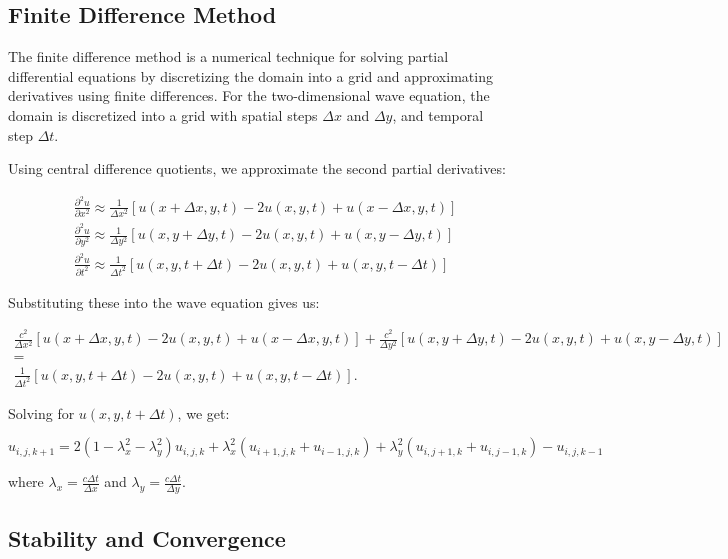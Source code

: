 \documentclass{article}
\begin{document}
\subsection{Finite Difference Method}

The finite difference method is a numerical technique for solving partial differential equations by discretizing the domain into a grid and approximating derivatives using finite differences. For the two-dimensional wave equation, the domain is discretized into a grid with spatial steps \(\Delta x\) and \(\Delta y\), and temporal step \(\Delta t\). \cite{zill2017diff}

Using central difference quotients, we approximate the second partial derivatives:

\[
\begin{aligned}
& \frac{\partial^2 u}{\partial x^2} \approx \frac{1}{\Delta x^2} [u(x+\Delta x, y, t) - 2u(x, y, t) + u(x-\Delta x, y, t)] \\
& \frac{\partial^2 u}{\partial y^2} \approx \frac{1}{\Delta y^2} [u(x, y+\Delta y, t) - 2u(x, y, t) + u(x, y-\Delta y, t)] \\
& \frac{\partial^2 u}{\partial t^2} \approx \frac{1}{\Delta t^2} [u(x, y, t+\Delta t) - 2u(x, y, t) + u(x, y, t-\Delta t)]
\end{aligned}
\]

Substituting these into the wave equation gives us:


\begin{gather*}
    \frac{c^2}{\Delta x^2} [u(x+\Delta x, y, t) - 2u(x, y, t) + u(x-\Delta x, y, t)] + \frac{c^2}{\Delta y^2} [u(x, y+\Delta y, t) - 2u(x, y, t) + u(x, y-\Delta y, t)] \\
    = \\
    \frac{1}{\Delta t^2} [u(x, y, t+\Delta t) - 2u(x, y, t) + u(x, y, t-\Delta t)]
.\end{gather*}

Solving for \(u(x, y, t+\Delta t)\), we get:

\begin{equation}
    u_{i,j,k+1} = 2(1 - \lambda_x^2 - \lambda_y^2)u_{i,j,k} + \lambda_x^2(u_{i+1,j,k} + u_{i-1,j,k}) + \lambda_y^2(u_{i,j+1,k} + u_{i,j-1,k}) - u_{i,j,k-1}
    \label{eq:fdm}
\end{equation}

where \(\lambda_x = \frac{c \Delta t}{\Delta x}\) and \(\lambda_y = \frac{c \Delta t}{\Delta y}\).

\subsection{Stability and Convergence}
\end{document}
